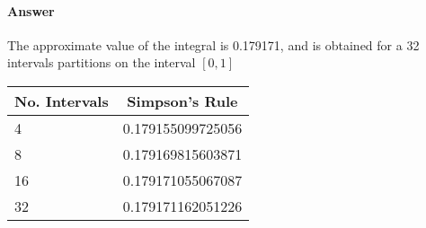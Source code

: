 \paragraph{Answer}
The approximate value of the integral is 0.179171, and is obtained for a 32
    intervals partitions on the interval $ [0, 1] $
\begin{table}
    \center
    \begin{tabular}[c]{l|l}
        \hline
        \multicolumn{1}{c|}{No. Intervals} &
        \multicolumn{1}{c}{Simpson's Rule} \\
        \hline
        4  & 0.179155099725056 \\
        8  & 0.179169815603871 \\
        16 & 0.179171055067087 \\
        32 & 0.179171162051226 \\
        \hline
    \end{tabular}
\end{table}
